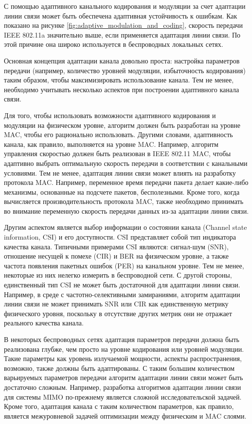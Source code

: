 \documentclass[14pt,a4paper,titlepage]{extarticle}
\begin{document}
С помощью адаптивного канального кодирования и модуляции за счет адаптации линии связи может быть обеспечена адаптивная устойчивость к ошибкам. Как показано на рисунке \ref{fig:adaptive_modulation_and_coding}, скорость передачи IEEE 802.11a значительно выше, если применяется адаптация линии связи. По этой причине она широко используется в беспроводных локальных сетях.

Основная концепция адаптации канала довольно проста: настройка параметров передачи (например, количество уровней модуляции, избыточность кодирования) таким образом, чтобы максимизировать использование канала. Тем не менее, необходимо учитывать несколько аспектов при построении адаптивного канала связи.

Для того, чтобы использовать возможности адаптивного кодирования и модуляции на физическом уровне, алгоритм должен быть разработан на уровне MAC, чтобы его рационально использовать. Другими словами, адаптивность канала, как правило, выполняется на уровне MAC. Например, алгоритм управления скоростью должен быть реализован в IEEE 802.11 MAC, чтобы адаптивно выбрать оптимальную скорость передачи в соответствии с канальными условиями. Тем не менее, адаптация линии связи может влиять на разработку протокола MAC. Например, переменное время передачи пакета делает какие-либо механизмы, основанные на подсчете пакетов, бесполезными. Кроме того, когда вычисляется производительность протокола MAC, также необходимо принимать во внимание переменную скорость передачи данных из-за адаптации линии связи.

Другим аспектом является выбор информации о состоянии канала (Channel state information, CSI) и его доступности. CSI представляет собой тип индикатора качества канала. Типичными примерами CSI являются: сигнал-шум (SNR), отношение несущей к помехе (CIR) и BER на физическом уровне, а также частота появления пакетных ошибок (PER) на канальном уровне. Тем не менее, некоторые из них нелегко измерить в беспроводной сети. С другой стороны, единственный тип CSI не может быть достаточной для адаптации линии связи. Например, в среде с частотно-селективными замираниями, алгоритм адаптации линии связи не может принимать SNR или CIR как единственную метрику физического уровня, поскольку в отсутствие других метрик они не отражает реального качества канала.

В некоторых беспроводных сетях адаптация параметров передачи должна быть реализована глубже, чем просто на уровне кодирования или уровней модуляции. Такие параметры как уровень излучаемой мощности, аспекты распространения, возможно, также должны быть адаптированы. С таким большим количеством варьируемых параметров передачи алгоритм адаптации линии связи может быть достаточно сложным. Например, разработка алгоритмов адаптации линии связи для системы MIMO по-прежнему является сложной исследовательской задачей. Кроме того, адаптация канала с таким количеством параметров, как правило, является межуровневой задачей оптимизации между физическим и MAC слоями.
\end{document}
